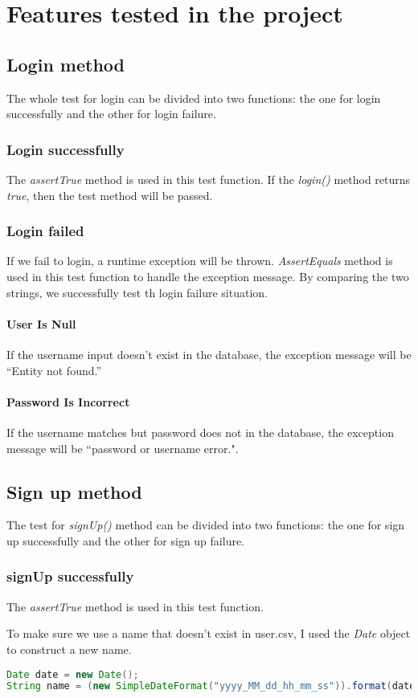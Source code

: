 \documentclass[a4paper]{report}
\begin{document}
\chapter{Features tested in the project}
\section{Login method}
\par The whole test for login can be divided into two functions: the one for login successfully and the other for login failure.
\subsection{Login successfully}
\par The \emph{assertTrue} method is used in this test function. If the \emph{login()} method returns \emph{true}, then the test method will be passed.
\subsection{Login failed}
\par If we fail to login, a runtime exception will be thrown. \emph{AssertEquals} method is used in this test function to handle the exception message. By comparing the two strings, we successfully test th login failure situation.
\subsubsection{User Is Null}
 \par If the username input doesn't exist in the database, the exception message will be ``Entity not found.''
\subsubsection{Password Is Incorrect}
\par If the username matches but password does not in the database, the exception message will be ``password or username error.". 
\section{Sign up method}
\par The test for \emph{signUp()} method can be divided into two functions: the one for sign up successfully and the other for sign up failure.
\subsection{signUp successfully}
\par The \emph{assertTrue} method is used in this test function.
\par To make sure we use a name that doesn't exist in user.csv, I used the \emph{Date} object to construct a new name.
\begin{lstlisting}[language=java]
Date date = new Date();
String name = (new SimpleDateFormat("yyyy_MM_dd_hh_mm_ss")).format(date);
\end{lstlisting}
\end{document}
